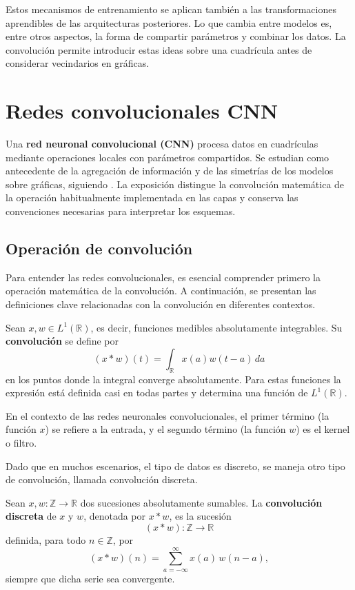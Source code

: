 Estos mecanismos de entrenamiento se aplican también a las transformaciones aprendibles de las arquitecturas posteriores. Lo que cambia entre modelos es, entre otros aspectos, la forma de compartir parámetros y combinar los datos. La convolución permite introducir estas ideas sobre una cuadrícula antes de considerar vecindarios en gráficas.

\section{Redes convolucionales CNN}
Una \textbf{red neuronal convolucional (CNN)} procesa datos en cuadrículas mediante operaciones locales con parámetros compartidos. Se estudian como antecedente de la agregación de información y de las simetrías de los modelos sobre gráficas, siguiendo \cite{Goodfellow-et-al-2016}. La exposición distingue la convolución matemática de la operación habitualmente implementada en las capas y conserva las convenciones necesarias para interpretar los esquemas.

\subsection{Operación de convolución}

Para entender las redes convolucionales, es esencial comprender primero la operación matemática de la convolución. A continuación, se presentan las definiciones clave relacionadas con la convolución en diferentes contextos.
\begin{definition}[Convolución]
\label{def:convolucion}
Sean $x,w\in L^1(\mathbb R)$, es decir, funciones medibles absolutamente integrables. Su \textbf{convolución} se define por
\[
(x\ast w)(t)=\int_{\mathbb R}x(a)w(t-a)\,da
\]
en los puntos donde la integral converge absolutamente. Para estas funciones la expresión está definida casi en todas partes y determina una función de $L^1(\mathbb R)$.
\end{definition}

En el contexto de las redes neuronales convolucionales, el primer término (la función $x$) se refiere a la entrada, y el segundo término (la función $w$) es el kernel o filtro.

Dado que en muchos escenarios, el tipo de datos es discreto, se maneja otro tipo de convolución, llamada convolución discreta.
\begin{definition}
\label{def:convolucion-discreta}
    Sean $x, w : \mathbb{Z} \to \mathbb{R}$ dos sucesiones absolutamente sumables.
    La \textbf{convolución discreta} de $x$ y $w$, denotada por $x \ast w$, es la sucesión
    \[
        (x \ast w) : \mathbb{Z} \to \mathbb{R}
    \]
    definida, para todo $n \in \mathbb{Z}$, por
    \[
        (x \ast w)(n) = \sum_{a=-\infty}^{\infty} x(a)\, w(n - a),
    \]
    siempre que dicha serie sea convergente.
\end{definition}

